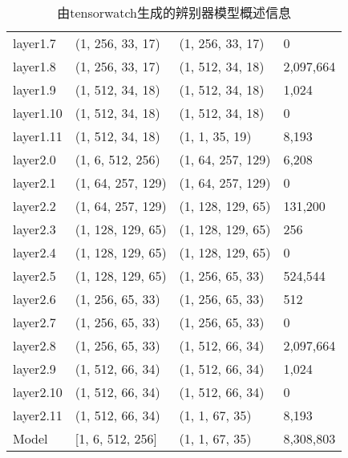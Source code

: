 \begin{table}[H]
\begin{tabular}{llll}
        layer1.7 &   (1, 256, 33, 17) &   (1, 256, 33, 17) &          0 \\
        layer1.8 &   (1, 256, 33, 17) &   (1, 512, 34, 18) &  2,097,664 \\
        layer1.9 &   (1, 512, 34, 18) &   (1, 512, 34, 18) &      1,024 \\
        layer1.10 &   (1, 512, 34, 18) &   (1, 512, 34, 18) &          0 \\
        layer1.11 &   (1, 512, 34, 18) &     (1, 1, 35, 19) &      8,193 \\
        layer2.0 &   (1, 6, 512, 256) &  (1, 64, 257, 129) &      6,208 \\
        layer2.1 &  (1, 64, 257, 129) &  (1, 64, 257, 129) &          0 \\
        layer2.2 &  (1, 64, 257, 129) &  (1, 128, 129, 65) &    131,200 \\
        layer2.3 &  (1, 128, 129, 65) &  (1, 128, 129, 65) &        256 \\
        layer2.4 &  (1, 128, 129, 65) &  (1, 128, 129, 65) &          0 \\
        layer2.5 &  (1, 128, 129, 65) &   (1, 256, 65, 33) &    524,544 \\
        layer2.6 &   (1, 256, 65, 33) &   (1, 256, 65, 33) &        512 \\
        layer2.7 &   (1, 256, 65, 33) &   (1, 256, 65, 33) &          0 \\
        layer2.8 &   (1, 256, 65, 33) &   (1, 512, 66, 34) &  2,097,664 \\
        layer2.9 &   (1, 512, 66, 34) &   (1, 512, 66, 34) &      1,024 \\
        layer2.10 &   (1, 512, 66, 34) &   (1, 512, 66, 34) &          0 \\
        layer2.11 &   (1, 512, 66, 34) &     (1, 1, 67, 35) &      8,193 \\
            Model &   [1, 6, 512, 256] &     (1, 1, 67, 35) &  8,308,803 \\
        \bottomrule
    \end{tabular}
    \caption{由tensorwatch生成的辨别器模型概述信息}
    \label{Pix2pixHD discriminator table}
\end{table}
    
